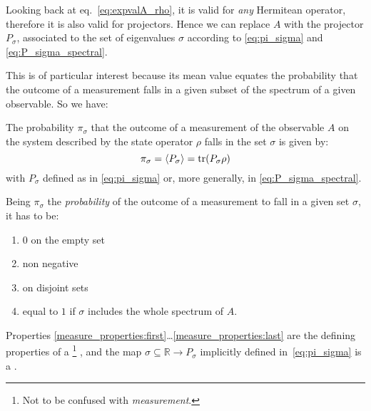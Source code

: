 Looking back at eq.~\eqref{eq:expvalA_rho},
it is valid for \emph{any} Hermitean operator,
therefore it is also valid for projectors.
Hence we can replace $A$ with the projector $P_{\sigma}$,
associated to the set of eigenvalues $\sigma$
according to \eqref{eq:pi_sigma} and \eqref{eq:P_sigma_spectral}.

This is of particular interest
because its mean value equates the probability that the outcome of a measurement
falls in a given subset of the spectrum of a given observable.
So we have:

\begin{proposition}\label{probability_rho}
  The probability $\pi_{\sigma}$
  that the outcome of a measurement of the observable $A$
  on the system described by the state operator $\rho$
  falls in the set $\sigma$
  is given by:
  \begin{equation}\label{eq:probability_rho}
    \pi_{\sigma} = \expval{P_{\sigma}} = \tr(P_{\sigma}\rho)
  \end{equation}
  with $P_{\sigma}$ defined as in \eqref{eq:pi_sigma}
  or, more generally, in \eqref{eq:P_sigma_spectral}.
\end{proposition}

Being $\pi_{\sigma}$ the \emph{probability} of the outcome of a measurement to
fall in a given set $\sigma$, it has to be:
\begin{enumerate}
  \item \label{measure_properties:first} $0$ on the empty set
  \item non negative
  \item \label{measure_properties:last}  on disjoint sets
  \item \label{measure_properties:normalized} equal to $1$ if $\sigma$ includes the whole spectrum of $A$.
\end{enumerate}

Properties \ref{measure_properties:first}\dots\ref{measure_properties:last}
are the defining properties of a \footnote{
  Not to be confused with \emph{measurement}.
} \parencite{EncMath_Measure},
and
the map $\sigma \subseteq \mathbb{R} \rightarrow P_{\sigma}$
implicitly defined in~\eqref{eq:pi_sigma} is a .

